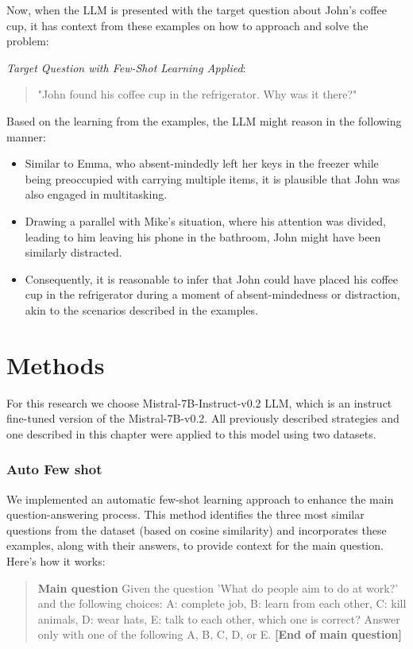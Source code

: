 \documentclass[fleqn,moreauthors,10pt]{ds_report}
\begin{document}
Now, when the LLM is presented with the target question about John's coffee cup, it has context from these examples on how to approach and solve the problem:

\textit{Target Question with Few-Shot Learning Applied}:
\begin{quote}
    "John found his coffee cup in the refrigerator. Why was it there?"
\end{quote}
Based on the learning from the examples, the LLM might reason in the following manner:
\begin{itemize}
    \item Similar to Emma, who absent-mindedly left her keys in the freezer while being preoccupied with carrying multiple items, it is plausible that John was also engaged in multitasking.
    \item Drawing a parallel with Mike's situation, where his attention was divided, leading to him leaving his phone in the bathroom, John might have been similarly distracted.
    \item Consequently, it is reasonable to infer that John could have placed his coffee cup in the refrigerator during a moment of absent-mindedness or distraction, akin to the scenarios described in the examples.
\end{itemize}



\section*{Methods}

For this research we choose Mistral-7B-Instruct-v0.2 LLM, which is an instruct fine-tuned version of the Mistral-7B-v0.2. All previously described strategies and one described in this chapter were applied to this model using two datasets. \cite{mistral} 


\subsubsection*{Auto Few shot}


    
    We implemented an automatic few-shot learning approach to enhance the main question-answering process. This method identifies the three most similar questions from the dataset (based on cosine similarity) and incorporates these examples, along with their answers, to provide context for the main question. Here's how it works:
    
    \begin{quote}
        \textbf{Main question} Given the question 'What do people aim to do at work?' and the following choices: A: complete job, B: learn from each other, C: kill animals, D: wear hats, E: talk to each other, which one is correct? Answer only with one of the following A, B, C, D, or E. \textbf{[End of main question]}
    \end{quote}
    
\end{document}
